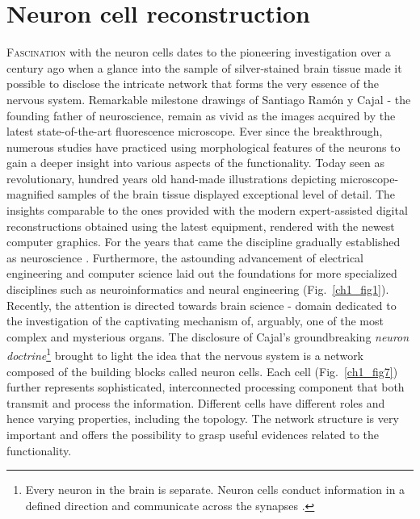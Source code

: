 \section{Neuron cell reconstruction} %
\lettrine{F}{ascination} with the neuron cells dates to the pioneering investigation over a century ago when a glance into the sample of silver-stained brain tissue made it possible to disclose the intricate network that forms the very essence of the nervous system. Remarkable milestone drawings of Santiago Ram\'{o}n y Cajal \cite{ramon2008histologia} - the founding father of neuroscience, remain as vivid as the images acquired by the latest state-of-the-art fluorescence microscope. Ever since the breakthrough, numerous studies \cite{ascoli2001computer,defelipe2002microstructure,defelipe1992pyramidal,van2001need,scorcioni2004quantitative,mason2007initiation,gensel2010semi,markram2015reconstruction} have practiced using morphological features of the neurons to gain a deeper insight into various aspects of the functionality. Today seen as revolutionary, hundred years old hand-made illustrations depicting microscope-magnified samples of the brain tissue \cite{swanson2017} displayed exceptional level of detail. The insights comparable to the ones provided with the modern expert-assisted digital reconstructions obtained using the latest equipment, rendered with the newest computer graphics. For the years that came the discipline gradually established as neuroscience \cite{kandel2000principles}. Furthermore, the astounding advancement of electrical engineering and computer science laid out the foundations for more specialized disciplines such as neuroinformatics and neural engineering (Fig.~\ref{ch1_fig1}). Recently, the attention is directed towards brain science - domain dedicated to the investigation of the captivating mechanism of, arguably, one of the most complex and mysterious organs. The disclosure of Cajal's groundbreaking \textit{neuron doctrine}\footnote{Every neuron in the brain is separate. Neuron cells conduct information in a defined direction and communicate across the synapses \cite{glickstein2006golgi}.} brought to light the idea that the nervous system is a network composed of the building blocks called neuron cells. Each cell (Fig.~\ref{ch1_fig7}) further represents sophisticated, interconnected processing component that both transmit and process the information. Different cells have different roles and hence varying properties, including the topology. The network structure is very important and offers the possibility to grasp useful evidences related to the functionality.

